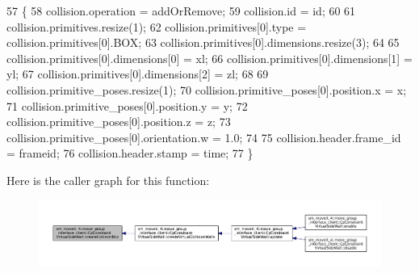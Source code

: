 \begin{DoxyCode}
57         \{
58             collision.operation = addOrRemove;
59             collision.id = id;
60 
61             collision.primitives.resize(1);
62             collision.primitives[0].type = collision.primitives[0].BOX;
63             collision.primitives[0].dimensions.resize(3);
64 
65             collision.primitives[0].dimensions[0] = xl;
66             collision.primitives[0].dimensions[1] = yl;
67             collision.primitives[0].dimensions[2] = zl;
68 
69             collision.primitive\_poses.resize(1);
70             collision.primitive\_poses[0].position.x = x;
71             collision.primitive\_poses[0].position.y = y;
72             collision.primitive\_poses[0].position.z = z;
73             collision.primitive\_poses[0].orientation.w = 1.0;
74 
75             collision.header.frame\_id = frameid;
76             collision.header.stamp = time;
77         \}
\end{DoxyCode}
Here is the caller graph for this function\+:
\nopagebreak
\begin{figure}[H]
\begin{center}
\leavevmode
\includegraphics[width=350pt]{classsm__moveit__4_1_1move__group__interface__client_1_1CpConstraintVirtualSideWall_a7522d984f70a916e649490dc19fab610_icgraph}
\end{center}
\end{figure}
\mbox{\label{classsm__moveit__4_1_1move__group__interface__client_1_1CpConstraintVirtualSideWall_a43db5b598dd9ce057517188f2350f33d}} 
